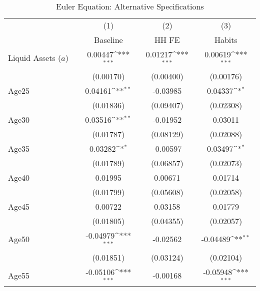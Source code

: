 {
\def\sym#1{\ifmmode^{#1}\else\(^{#1}\)\fi}
\begin{longtable}{l*{3}{c}}
\caption{Euler Equation: Alternative Specifications}\\
\toprule\endfirsthead\midrule\endhead\midrule\endfoot\endlastfoot
                    &\multicolumn{1}{c}{(1)}&\multicolumn{1}{c}{(2)}&\multicolumn{1}{c}{(3)}\\
                    &\multicolumn{1}{c}{Baseline}&\multicolumn{1}{c}{HH FE}&\multicolumn{1}{c}{Habits}\\
\midrule
Liquid Assets ($ a $) $\;\;\;\;\;\;\;\;\;\;\;\;$&     0.00447\sym{***}&     0.01217\sym{***}&     0.00619\sym{***}\\
                    &   (0.00170)         &   (0.00400)         &   (0.00176)         \\
\addlinespace
Age25               &     0.04161\sym{**} &    -0.03985         &     0.04337\sym{*}  \\
                    &   (0.01836)         &   (0.09407)         &   (0.02308)         \\
\addlinespace
Age30               &     0.03516\sym{**} &    -0.01952         &     0.03011         \\
                    &   (0.01787)         &   (0.08129)         &   (0.02088)         \\
\addlinespace
Age35               &     0.03282\sym{*}  &    -0.00597         &     0.03497\sym{*}  \\
                    &   (0.01789)         &   (0.06857)         &   (0.02073)         \\
\addlinespace
Age40               &     0.01995         &     0.00671         &     0.01714         \\
                    &   (0.01799)         &   (0.05608)         &   (0.02058)         \\
\addlinespace
Age45               &     0.00722         &     0.03158         &     0.01779         \\
                    &   (0.01805)         &   (0.04355)         &   (0.02057)         \\
\addlinespace
Age50               &    -0.04979\sym{***}&    -0.02562         &    -0.04489\sym{**} \\
                    &   (0.01851)         &   (0.03124)         &   (0.02104)         \\
\addlinespace
Age55               &    -0.05106\sym{***}&    -0.00168         &    -0.05948\sym{***}\\

\end{longtable}}
